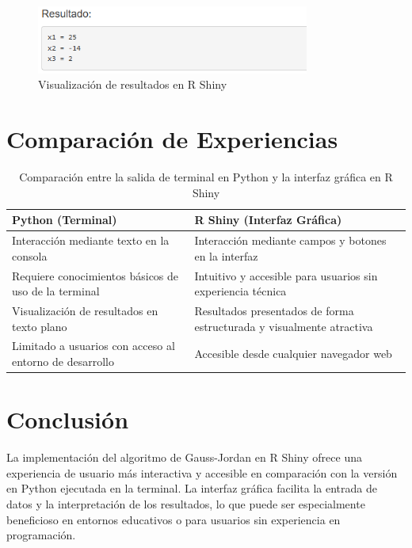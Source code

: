 \documentclass[12pt]{article}
\begin{document}
\begin{figure}[H]
    \centering
    \includegraphics[width=0.8\textwidth]{salida_interfaz.png}
    \caption{Visualización de resultados en R Shiny}
    \label{fig:r_shiny_output}
\end{figure}

\section{Comparación de Experiencias}

\begin{table}[H]
\centering
\begin{tabular}{|p{5cm}|p{5cm}|}
\hline
\textbf{Python (Terminal)} & \textbf{R Shiny (Interfaz Gráfica)} \\
\hline
Interacción mediante texto en la consola & Interacción mediante campos y botones en la interfaz \\
\hline
Requiere conocimientos básicos de uso de la terminal & Intuitivo y accesible para usuarios sin experiencia técnica \\
\hline
Visualización de resultados en texto plano & Resultados presentados de forma estructurada y visualmente atractiva \\
\hline
Limitado a usuarios con acceso al entorno de desarrollo & Accesible desde cualquier navegador web \\
\hline
\end{tabular}
\caption{Comparación entre la salida de terminal en Python y la interfaz gráfica en R Shiny}
\label{tab:comparison}
\end{table}



\section{Conclusión}

La implementación del algoritmo de Gauss-Jordan en R Shiny ofrece una experiencia de usuario más interactiva y accesible en comparación con la versión en Python ejecutada en la terminal. La interfaz gráfica facilita la entrada de datos y la interpretación de los resultados, lo que puede ser especialmente beneficioso en entornos educativos o para usuarios sin experiencia en programación.
\end{document}

